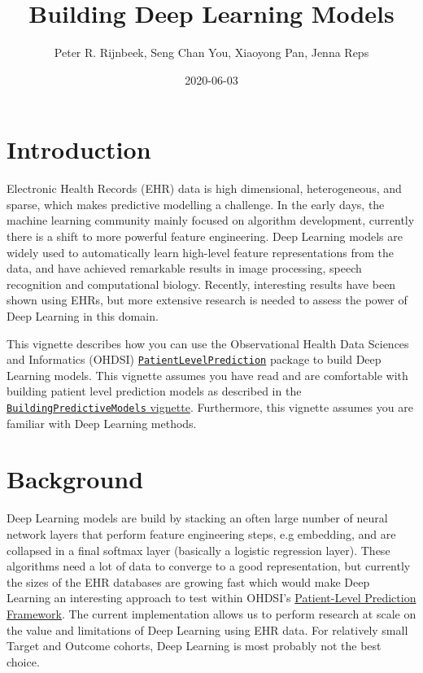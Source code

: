 \documentclass[
]{article}
\title{Building Deep Learning Models}
\author{Peter R. Rijnbeek, Seng Chan You, Xiaoyong Pan, Jenna Reps}
\date{2020-06-03}
\begin{document}
\maketitle

{
\setcounter{tocdepth}{2}
\tableofcontents
}
\hypertarget{introduction}{%
\section{Introduction}\label{introduction}}

Electronic Health Records (EHR) data is high dimensional, heterogeneous,
and sparse, which makes predictive modelling a challenge. In the early
days, the machine learning community mainly focused on algorithm
development, currently there is a shift to more powerful feature
engineering. Deep Learning models are widely used to automatically learn
high-level feature representations from the data, and have achieved
remarkable results in image processing, speech recognition and
computational biology. Recently, interesting results have been shown
using EHRs, but more extensive research is needed to assess the power of
Deep Learning in this domain.

This vignette describes how you can use the Observational Health Data
Sciences and Informatics (OHDSI)
\href{http://github.com/OHDSI/PatientLevelPrediction}{\texttt{PatientLevelPrediction}}
package to build Deep Learning models. This vignette assumes you have
read and are comfortable with building patient level prediction models
as described in the
\href{https://github.com/OHDSI/PatientLevelPrediction/blob/master/inst/doc/BuildingPredictiveModels.pdf}{\texttt{BuildingPredictiveModels}
vignette}. Furthermore, this vignette assumes you are familiar with Deep
Learning methods.

\hypertarget{background}{%
\section{Background}\label{background}}

Deep Learning models are build by stacking an often large number of
neural network layers that perform feature engineering steps, e.g
embedding, and are collapsed in a final softmax layer (basically a
logistic regression layer). These algorithms need a lot of data to
converge to a good representation, but currently the sizes of the EHR
databases are growing fast which would make Deep Learning an interesting
approach to test within OHDSI's
\href{https://academic.oup.com/jamia/article/25/8/969/4989437}{Patient-Level
Prediction Framework}. The current implementation allows us to perform
research at scale on the value and limitations of Deep Learning using
EHR data. For relatively small Target and Outcome cohorts, Deep Learning
is most probably not the best choice.
\end{document}
